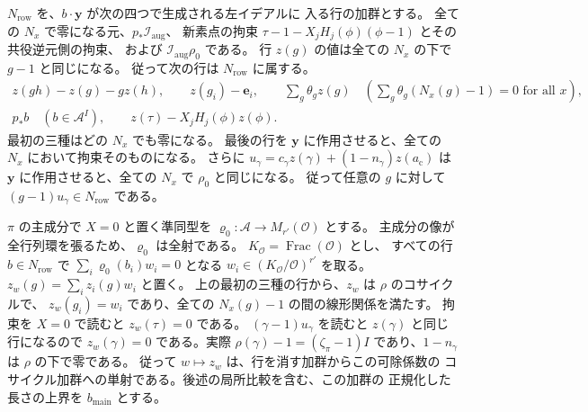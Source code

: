 \(N_\mathrm{row}\) を、\(b\cdot\mathbf y\) が次の四つで生成される左イデアルに
入る行の加群とする。
全ての \(N_x\) で零になる元、\(p_\ast\mathcal I_\mathrm{aug}\)、
新素点の拘束 \(\tau-1-X_jH_j(\phi)(\phi-1)\) とその共役逆元側の拘束、
および \(\mathcal I_\mathrm{aug}\rho_0\) である。
行 \(z(g)\) の値は全ての \(N_x\) の下で \(g-1\) と同じになる。
従って次の行は \(N_\mathrm{row}\) に属する。
\[
 \begin{gathered}
 z(gh)-z(g)-g z(h),\qquad z(g_i)-\mathbf e_i,\qquad
 \sum_g\theta_g z(g)\quad
     \left(\sum_g\theta_g (N_x(g)-1)=0\text{ for all }x\right),\\
 p_\ast b\quad (b\in\mathcal A^I),\qquad
 z(\tau)-X_jH_j(\phi)z(\phi).
 \end{gathered}
\]
最初の三種はどの \(N_x\) でも零になる。
最後の行を \(\mathbf y\) に作用させると、全ての \(N_x\) において拘束そのものになる。
さらに \(u_\gamma=c_\gamma z(\gamma)+(1-n_\gamma)z(a_{\mathrm c})\) は
\(\mathbf y\) に作用させると、全ての \(N_x\) で \(\rho_0\) と同じになる。
従って任意の \(g\) に対して \((g-1)u_\gamma\in N_\mathrm{row}\) である。

\(\pi\) の主成分で \(X=0\) と置く準同型を
\(\varrho_0\colon\mathcal A\to M_{r'}(\mathcal O)\) とする。
主成分の像が全行列環を張るため、\(\varrho_0\) は全射である。
\(K_{\mathcal O}=\operatorname{Frac}(\mathcal O)\) とし、
すべての行 \(b\in N_\mathrm{row}\) で
\(\sum_i\varrho_0(b_i)w_i=0\) となる
\(w_i\in(K_{\mathcal O}/\mathcal O)^{r'}\) を取る。
\(z_w(g)=\sum_i z_i(g)w_i\) と置く。
上の最初の三種の行から、\(z_w\) は \(\rho\) のコサイクルで、
\(z_w(g_i)=w_i\) であり、全ての \(N_x(g)-1\) の間の線形関係を満たす。
拘束を \(X=0\) で読むと \(z_w(\tau)=0\) である。
\((\gamma-1)u_\gamma\) を読むと \(z(\gamma)\) と同じ行になるので
\(z_w(\gamma)=0\) である。実際 \(\rho(\gamma)-1=(\zeta_\pi-1)I\)
であり、\(1-n_\gamma\) は \(\rho\) の下で零である。
従って \(w\mapsto z_w\) は、行を消す加群からこの可除係数の
コサイクル加群への単射である。後述の局所比較を含む、この加群の
正規化した長さの上界を \(b_{\mathrm{main}}\) とする。

